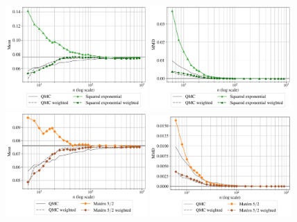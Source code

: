 \begin{figure}[!h]
\begin{center}
    \includegraphics[width=0.48\textwidth]{part2/figures/DCE/analytical_bench/GSobol 10D (normal input)_convergence_SE.pdf}
    \includegraphics[width=0.48\textwidth]{part2/figures/DCE/analytical_bench/GSobol 10D (normal input)_convergence_MMD_SE.pdf}\\
    \includegraphics[width=0.48\textwidth]{part2/figures/DCE/analytical_bench/GSobol 10D (normal input)_convergence_Matern.pdf}
    \includegraphics[width=0.48\textwidth]{part2/figures/DCE/analytical_bench/GSobol 10D (normal input)_convergence_MMD_Matern.pdf}\\

\end{center}
\end{figure}
